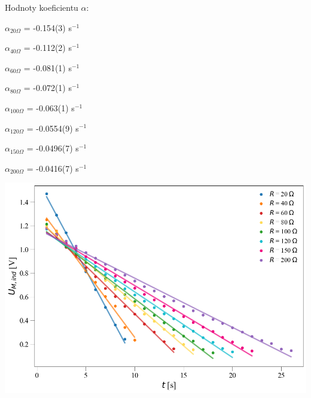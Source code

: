 \documentclass[a4paper,11pt]{article}
\begin{document}
    \begin{minipage}[t]{0.5\textwidth} 
                Hodnoty koeficientu $\alpha$:
                \begin{center}
                    \begin{multicols}{2}
                        $\alpha_{20\Omega}$ = -0.154(3) s$^{-1}$
                        \par $\alpha_{40\Omega}$ = -0.112(2) s$^{-1}$
                        \par $\alpha_{60\Omega}$ = -0.081(1) s$^{-1}$
                        \par $\alpha_{80\Omega}$ = -0.072(1) s$^{-1}$
                        \par $\alpha_{100\Omega}$ = -0.063(1) s$^{-1}$
                        \par $\alpha_{120\Omega}$ = -0.0554(9) s$^{-1}$
                        \par $\alpha_{150\Omega}$ = -0.0496(7) s$^{-1}$
                        \par $\alpha_{200\Omega}$ = -0.0416(7) s$^{-1}$
                    \end{multicols}
                \end{center}
                \vspace{10pt}   
                \par \centering
                \includegraphics[scale=0.35]{alpha}
                \captionsetup{justification=centering, font=footnotesize}
                \label{fig:alpha}
                \vspace{10pt}
                \raggedright
    \end{minipage}
\end{document}
